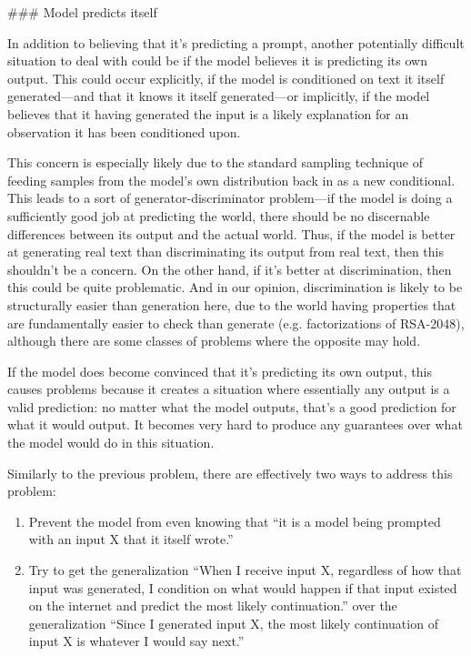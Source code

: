 {### Model predicts itself

In addition to believing that it's predicting a prompt, another potentially difficult situation to deal with could be if the model believes it is predicting its own output. This could occur explicitly, if the model is conditioned on text it itself generated---and that it knows it itself generated---or implicitly, if the model believes that it having generated the input is a likely explanation for an observation it has been conditioned upon.

This concern is especially likely due to the standard sampling technique of feeding samples from the model's own distribution back in as a new conditional. This leads to a sort of generator-discriminator problem---if the model is doing a sufficiently good job at predicting the world, there should be no discernable differences between its output and the actual world. Thus, if the model is better at generating real text than discriminating its output from real text, then this shouldn't be a concern. On the other hand, if it's better at discrimination, then this could be quite problematic. And in our opinion, discrimination is likely to be structurally easier than generation here, due to the world having properties that are fundamentally easier to check than generate (e.g. factorizations of RSA-2048\cite{TODO: cite https://ai-alignment.com/training-robust-corrigibility-ce0e0a3b9b4d}), although there are some classes of problems\cite{TODO: cite https://www.lesswrong.com/posts/2PDC69DDJuAx6GANa/verification-is-not-easier-than-generation-in-general} where the opposite may hold.

If the model does become convinced that it's predicting its own output, this causes problems because it creates a situation where essentially any output is a valid prediction: no matter what the model outputs, that's a good prediction for what it would output. It becomes very hard to produce any guarantees over what the model would do in this situation.

Similarly to the previous problem, there are effectively two ways to address this problem:



\begin{enumerate}
\item Prevent the model from even knowing that ``it is a model being prompted with an input X that it itself wrote.''
\item Try to get the generalization ``When I receive input X, regardless of how that input was generated, I condition on what would happen if that input existed on the internet and predict the most likely continuation.'' over the generalization ``Since I generated input X, the most likely continuation of input X is whatever I would say next.''
\end{enumerate}

}
